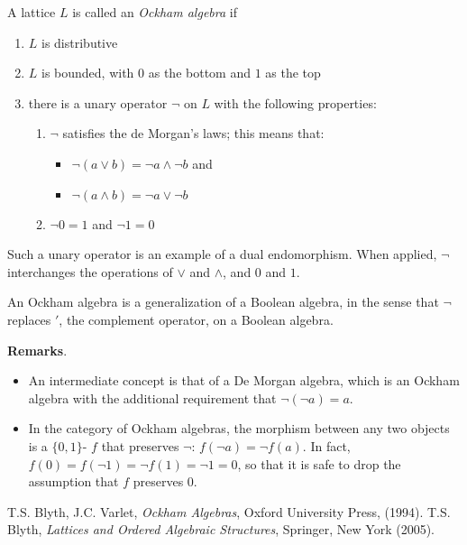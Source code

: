 \documentclass[12pt]{article}
\begin{document}
A lattice $L$ is called an \emph{Ockham algebra} if 
\begin{enumerate}
\item $L$ is distributive
\item $L$ is bounded, with $0$ as the bottom and $1$ as the top
\item there is a unary operator $\neg$ on $L$ with the following properties:
\begin{enumerate}
\item $\neg$ satisfies the de Morgan's laws; this means that:
\begin{itemize}
\item $\neg (a\vee b)=\neg a\wedge \neg b$ and
\item $\neg (a\wedge b)=\neg a\vee \neg b$
\end{itemize}
\item $\neg 0=1$ and $\neg 1=0$
\end{enumerate}
\end{enumerate}
Such a unary operator is an example of a dual endomorphism.  When applied, $\neg$ interchanges the operations of $\vee$ and $\wedge$, and $0$ and $1$.


An Ockham algebra is a generalization of a Boolean algebra, in the sense that $\neg$ replaces $'$, the complement operator, on a Boolean algebra.

\textbf{Remarks}. 
\begin{itemize}
\item
An intermediate concept is that of a De Morgan algebra, which is an Ockham algebra with the additional requirement that $\neg (\neg a)=a$.
\item
In the category of Ockham algebras, the morphism between any two objects is a $\lbrace 0,1\rbrace$- $f$ that preserves $\neg$: $f(\neg a)=\neg f(a)$.  In fact, $f(0)=f(\neg 1)=\neg f(1)=\neg 1=0$, so that it is safe to drop the assumption that $f$ preserves $0$.
\end{itemize}

\begin{thebibliography}{8}
 T.S. Blyth, J.C. Varlet, {\em Ockham Algebras}, Oxford University Press, (1994).
 T.S. Blyth, {\em Lattices and Ordered Algebraic Structures}, Springer, New York (2005).
\end{thebibliography}
\end{document}
